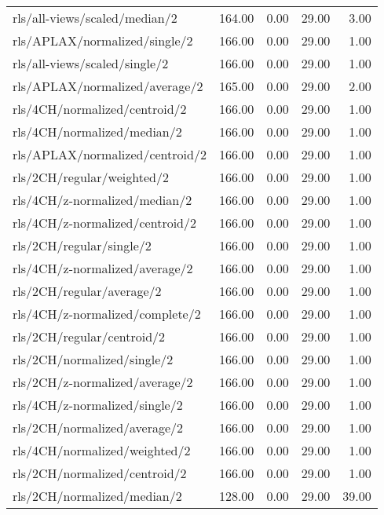 \begin{longtable}{lrrrr}
    rls/all-views/scaled/median/2             & 164.00 &  0.00 & 29.00 &  3.00 \\
    rls/APLAX/normalized/single/2             & 166.00 &  0.00 & 29.00 &  1.00 \\
    rls/all-views/scaled/single/2             & 166.00 &  0.00 & 29.00 &  1.00 \\
    rls/APLAX/normalized/average/2            & 165.00 &  0.00 & 29.00 &  2.00 \\
    rls/4CH/normalized/centroid/2             & 166.00 &  0.00 & 29.00 &  1.00 \\
    rls/4CH/normalized/median/2               & 166.00 &  0.00 & 29.00 &  1.00 \\
    rls/APLAX/normalized/centroid/2           & 166.00 &  0.00 & 29.00 &  1.00 \\
    rls/2CH/regular/weighted/2                & 166.00 &  0.00 & 29.00 &  1.00 \\
    rls/4CH/z-normalized/median/2             & 166.00 &  0.00 & 29.00 &  1.00 \\
    rls/4CH/z-normalized/centroid/2           & 166.00 &  0.00 & 29.00 &  1.00 \\
    rls/2CH/regular/single/2                  & 166.00 &  0.00 & 29.00 &  1.00 \\
    rls/4CH/z-normalized/average/2            & 166.00 &  0.00 & 29.00 &  1.00 \\
    rls/2CH/regular/average/2                 & 166.00 &  0.00 & 29.00 &  1.00 \\
    rls/4CH/z-normalized/complete/2           & 166.00 &  0.00 & 29.00 &  1.00 \\
    rls/2CH/regular/centroid/2                & 166.00 &  0.00 & 29.00 &  1.00 \\
    rls/2CH/normalized/single/2               & 166.00 &  0.00 & 29.00 &  1.00 \\
    rls/2CH/z-normalized/average/2            & 166.00 &  0.00 & 29.00 &  1.00 \\
    rls/4CH/z-normalized/single/2             & 166.00 &  0.00 & 29.00 &  1.00 \\
    rls/2CH/normalized/average/2              & 166.00 &  0.00 & 29.00 &  1.00 \\
    rls/4CH/normalized/weighted/2             & 166.00 &  0.00 & 29.00 &  1.00 \\
    rls/2CH/normalized/centroid/2             & 166.00 &  0.00 & 29.00 &  1.00 \\
    rls/2CH/normalized/median/2               & 128.00 &  0.00 & 29.00 & 39.00 \\

\end{longtable}
